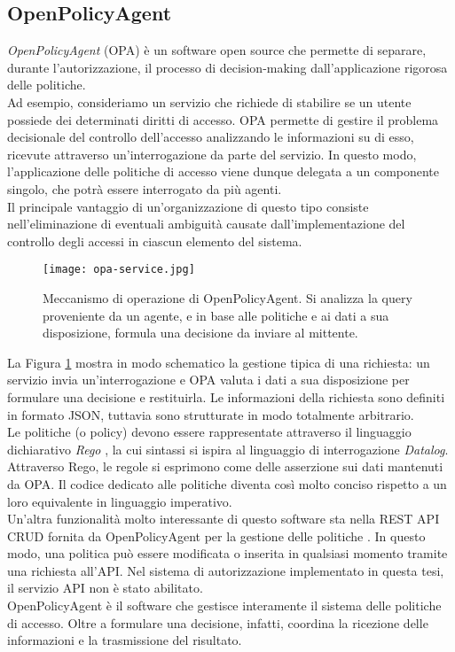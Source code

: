 \subsection{OpenPolicyAgent}
\textit{OpenPolicyAgent} (OPA) \cite{opa_bib} è un software open source che permette di separare, durante l'autorizzazione, il processo di
 decision-making  dall'applicazione rigorosa delle politiche.
\\ Ad esempio, consideriamo un servizio che richiede di stabilire se un utente possiede dei determinati diritti di accesso.
OPA permette di gestire il problema decisionale del controllo dell'accesso analizzando le informazioni su di esso, ricevute attraverso un'interrogazione da parte del servizio. 
In questo modo, l'applicazione delle politiche di accesso viene dunque delegata a un componente singolo, che potrà essere interrogato da più 
agenti.\\ Il principale vantaggio di un'organizzazione di questo tipo consiste nell'eliminazione di eventuali ambiguità
 causate dall'implementazione del controllo degli accessi in ciascun elemento del sistema. 
\begin{figure}[h]
    \texttt{[image: opa-service.jpg]}
    \centering
    \caption[Meccanismo di operazione di OPA]{Meccanismo di operazione di OpenPolicyAgent. Si analizza la query proveniente da un agente, e in base alle politiche e ai dati a sua disposizione, formula una decisione da inviare al mittente. }
    \label{OPAWork}
\end{figure} 
La Figura \ref*{OPAWork} mostra in modo schematico la gestione tipica di una richiesta: un servizio invia un'interrogazione
 e OPA valuta i dati a sua disposizione per formulare una decisione e restituirla. 
Le informazioni della richiesta sono definiti in formato JSON, tuttavia sono strutturate in modo totalmente arbitrario. 
\\ Le politiche (o policy) devono essere rappresentate attraverso il linguaggio dichiarativo 
\textit{Rego} \cite{rego_doc}, la cui sintassi si ispira al linguaggio 
di interrogazione \textit{Datalog}. 
Attraverso Rego, le regole si esprimono come delle asserzione sui dati mantenuti da OPA.
Il codice dedicato alle politiche diventa così molto conciso rispetto a un loro equivalente in 
linguaggio imperativo. 
\\ Un'altra funzionalità molto interessante di questo software sta nella REST API CRUD fornita da OpenPolicyAgent per la gestione delle politiche \cite{opa_api}. In questo modo, una politica può essere modificata o inserita 
in qualsiasi momento tramite una richiesta all'API. Nel sistema di autorizzazione implementato in questa tesi, il servizio API non è stato abilitato. 
\\ OpenPolicyAgent è il software che gestisce interamente il sistema delle politiche di accesso. Oltre a formulare una decisione,
 infatti, coordina la ricezione delle informazioni e la trasmissione del risultato.  


